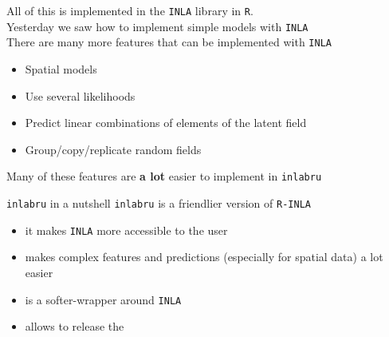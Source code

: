 \documentclass[
  ignorenonframetext,
]{beamer}
\begin{document}
\begin{frame}[fragile]{}
\protect\hypertarget{section}{}
All of this is implemented in the \texttt{INLA} library in \texttt{R}.\\

Yesterday we saw how to implement simple models with \texttt{INLA}\\

There are many more features that can be implemented with \texttt{INLA}

\pause

\begin{itemize}
\item
  Spatial models
\item
  Use several likelihoods
\item
  Predict linear combinations of elements of the latent field
\item
  Group/copy/replicate random fields
\end{itemize}

\pause

Many of these features are \textbf{a lot} easier to implement in
\texttt{inlabru}
\end{frame}

\begin{frame}[fragile]{\texttt{inlabru} in a nutshell}
\protect\hypertarget{inlabru-in-a-nutshell}{}
\texttt{inlabru} is a friendlier version of \texttt{R-INLA}

\begin{itemize}
\item
  it makes \texttt{INLA} more accessible to the user
\item
  makes complex features and predictions (especially for spatial data) a
  lot easier
\item
  is a softer-wrapper around \texttt{INLA}
\item
  allows to release the
\end{itemize}
\end{frame}
\end{document}
